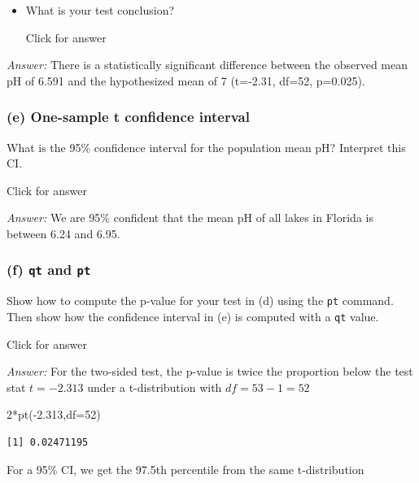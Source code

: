 \documentclass[
]{book}
\newenvironment{Shaded}{\begin{snugshade}}{\end{snugshade}}
\newcommand{\AttributeTok}[1]{\textcolor[rgb]{0.77,0.63,0.00}{#1}}
\newcommand{\DecValTok}[1]{\textcolor[rgb]{0.00,0.00,0.81}{#1}}
\newcommand{\FloatTok}[1]{\textcolor[rgb]{0.00,0.00,0.81}{#1}}
\newcommand{\FunctionTok}[1]{\textcolor[rgb]{0.00,0.00,0.00}{#1}}
\newcommand{\NormalTok}[1]{#1}
\newcommand{\SpecialCharTok}[1]{\textcolor[rgb]{0.00,0.00,0.00}{#1}}
\providecommand{\tightlist}{%
  \setlength{\itemsep}{0pt}\setlength{\parskip}{0pt}}
\begin{document}
\begin{itemize}
\tightlist
\item
  What is your test conclusion?

  Click for answer
\end{itemize}

\emph{Answer:} There is a statistically significant difference between the observed mean pH of 6.591 and the hypothesized mean of 7 (t=-2.31, df=52, p=0.025).

\hypertarget{e-one-sample-t-confidence-interval}{%
\subsubsection{(e) One-sample t confidence interval}\label{e-one-sample-t-confidence-interval}}

What is the 95\% confidence interval for the population mean pH? Interpret this CI.

Click for answer

\emph{Answer:} We are 95\% confident that the mean pH of all lakes in Florida is between 6.24 and 6.95.

\hypertarget{f-qt-and-pt}{%
\subsubsection{\texorpdfstring{(f) \texttt{qt} and \texttt{pt}}{(f) qt and pt}}\label{f-qt-and-pt}}

Show how to compute the p-value for your test in (d) using the \texttt{pt} command. Then show how the confidence interval in (e) is computed with a \texttt{qt} value.

Click for answer

\emph{Answer:} For the two-sided test, the p-value is twice the proportion below the test stat \(t=-2.313\) under a t-distribution with \(df=53-1=52\)

\begin{Shaded}
\begin{Highlighting}[]
\DecValTok{2}\SpecialCharTok{*}\FunctionTok{pt}\NormalTok{(}\SpecialCharTok{{-}}\FloatTok{2.313}\NormalTok{,}\AttributeTok{df=}\DecValTok{52}\NormalTok{)}
\end{Highlighting}
\end{Shaded}

\begin{verbatim}
[1] 0.02471195
\end{verbatim}

For a 95\% CI, we get the 97.5th percentile from the same t-distribution
\end{document}
